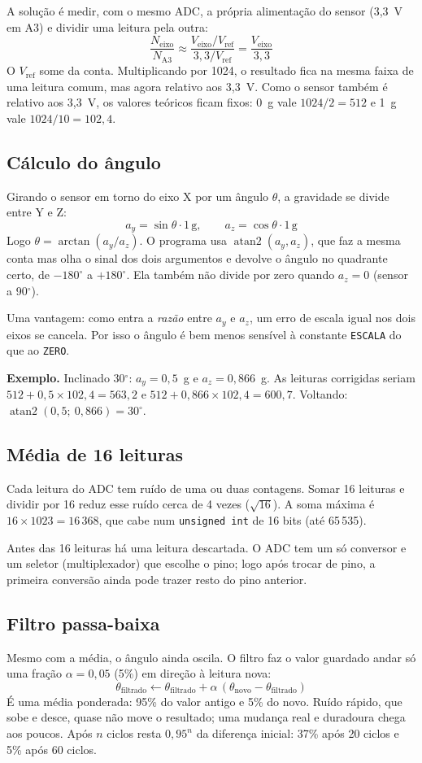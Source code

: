 \documentclass[11pt,a4paper]{article}
\begin{document}
A solução é medir, com o mesmo ADC, a própria alimentação do sensor
(3,3~V em A3) e dividir uma leitura pela outra:
\[
  \frac{N_\text{eixo}}{N_\text{A3}}
  \approx \frac{V_\text{eixo}/V_\text{ref}}{3{,}3/V_\text{ref}}
  = \frac{V_\text{eixo}}{3{,}3}
\]
O $V_\text{ref}$ some da conta. Multiplicando por 1024, o resultado
fica na mesma faixa de uma leitura comum, mas agora relativo aos
3,3~V. Como o sensor também é relativo aos 3,3~V, os valores teóricos
ficam fixos: 0~g vale $1024/2 = 512$ e 1~g vale $1024/10 = 102{,}4$.

\subsection{Cálculo do ângulo}\label{sec:angulo}
Girando o sensor em torno do eixo X por um ângulo $\theta$, a gravidade
se divide entre Y e Z:
\[
  a_y = \sin\theta \cdot 1\,\text{g}, \qquad a_z = \cos\theta \cdot 1\,\text{g}
\]
Logo $\theta = \arctan(a_y / a_z)$. O programa usa
$\operatorname{atan2}(a_y, a_z)$, que faz a mesma conta mas olha o
sinal dos dois argumentos e devolve o ângulo no quadrante certo, de
$-180^\circ$ a $+180^\circ$. Ela também não divide por zero quando
$a_z = 0$ (sensor a 90$^\circ$).

Uma vantagem: como entra a \emph{razão} entre $a_y$ e $a_z$, um erro de
escala igual nos dois eixos se cancela. Por isso o ângulo é bem menos
sensível à constante \texttt{ESCALA} do que ao \texttt{ZERO}.

\textbf{Exemplo.} Inclinado 30$^\circ$: $a_y = 0{,}5$~g e
$a_z = 0{,}866$~g. As leituras corrigidas seriam
$512 + 0{,}5 \times 102{,}4 = 563{,}2$ e
$512 + 0{,}866 \times 102{,}4 = 600{,}7$.
Voltando: $\operatorname{atan2}(0{,}5;\ 0{,}866) = 30^\circ$.

\subsection{Média de 16 leituras}\label{sec:media}
Cada leitura do ADC tem ruído de uma ou duas contagens. Somar 16
leituras e dividir por 16 reduz esse ruído cerca de 4 vezes
($\sqrt{16}$). A soma máxima é $16 \times 1023 = 16\,368$, que cabe
num \texttt{unsigned int} de 16 bits (até 65\,535).

Antes das 16 leituras há uma leitura descartada. O ADC tem um só
conversor e um seletor (multiplexador) que escolhe o pino; logo após
trocar de pino, a primeira conversão ainda pode trazer resto do pino
anterior.

\subsection{Filtro passa-baixa}\label{sec:filtro}
Mesmo com a média, o ângulo ainda oscila. O filtro faz o valor
guardado andar só uma fração $\alpha = 0{,}05$ (5\%) em direção à
leitura nova:
\[
  \theta_\text{filtrado} \leftarrow \theta_\text{filtrado}
    + \alpha\,(\theta_\text{novo} - \theta_\text{filtrado})
\]
É uma média ponderada: 95\% do valor antigo e 5\% do novo. Ruído
rápido, que sobe e desce, quase não move o resultado; uma mudança real
e duradoura chega aos poucos. Após $n$ ciclos resta $0{,}95^n$ da
diferença inicial: 37\% após 20 ciclos e 5\% após 60 ciclos.
\end{document}
